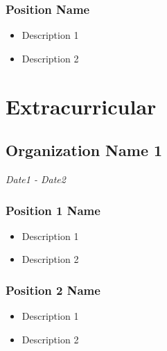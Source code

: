 \documentclass{article}
\renewcommand{\date}[1]{
    \hfill{\normalsize\textit{#1}}
}
\begin{document}
            \subsubsection{Position Name}
                \begin{itemize}
                    \item Description 1
                    \item Description 2
                \end{itemize}
    \section{Extracurricular}

        \subsection{Organization Name 1}\date{Date1 - Date2}
            \subsubsection{Position 1 Name}
                \begin{itemize}
                    \item Description 1
                    \item Description 2 
                \end{itemize}
            \subsubsection{Position 2 Name} %
                \begin{itemize}
                    \item Description 1
                    \item Description 2
                \end{itemize}
\end{document}
